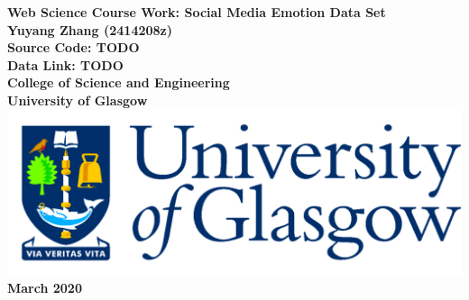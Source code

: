 \documentclass[12pt,titlepage,oneside]{article}
\begin{document}
\begin{titlepage}
  \centering
  \vspace*{3cm}  %
  \bfseries\Large
  Web Science Course Work: Social	Media	Emotion	Data	Set\\
  \vspace{3cm}
  \normalfont\large
  Yuyang Zhang (2414208z)\\
  \vspace{1cm}
  Source Code: TODO\\
  Data Link: TODO\\
  \vspace{2cm}
  College of Science and Engineering\\
  University of Glasgow\\
  \vspace{1cm}
  \includegraphics[scale=0.125]{GlaLogo.pdf}
  \\
  \vspace{1cm}
  March 2020
\end{titlepage}
% 
\tableofcontents
% 




% 
\appendix

\end{document}
